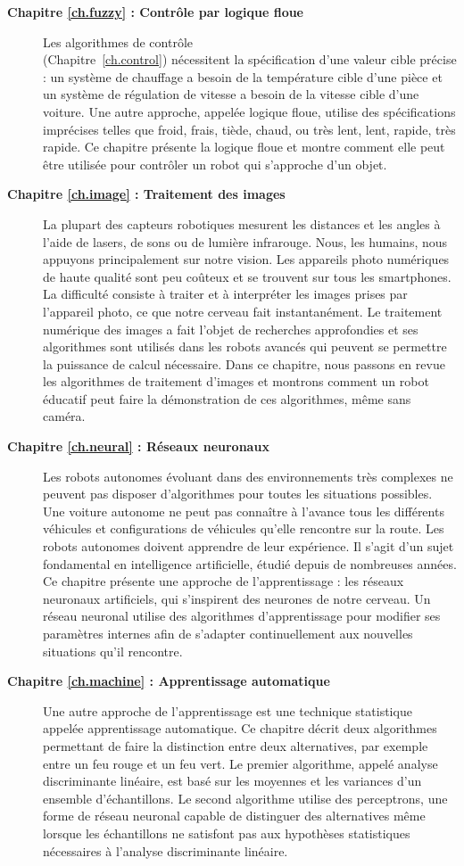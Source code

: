 \begin{description}
\item [\textbf{Chapitre \ref{ch.fuzzy} : Contrôle par logique floue}]
Les algorithmes de contrôle\\(Chapitre~\ref{ch.control}) nécessitent la spécification d'une valeur cible précise : un système de chauffage a besoin de la température cible d'une pièce et un système de régulation de vitesse a besoin de la vitesse cible d'une voiture. Une autre approche, appelée logique floue, utilise des spécifications imprécises telles que froid, frais, tiède, chaud, ou très lent, lent, rapide, très rapide. Ce chapitre présente la logique floue et montre comment elle peut être utilisée pour contrôler un robot qui s'approche d'un objet.
\smallskip
\item [\textbf{Chapitre \ref{ch.image} : Traitement des images}] La plupart des capteurs robotiques mesurent les distances et les angles à l'aide de lasers, de sons ou de lumière infrarouge. Nous, les humains, nous appuyons principalement sur notre vision. Les appareils photo numériques de haute qualité sont peu coûteux et se trouvent sur tous les smartphones. La difficulté consiste à traiter et à interpréter les images prises par l'appareil photo, ce que notre cerveau fait instantanément. Le traitement numérique des images a fait l'objet de recherches approfondies et ses algorithmes sont utilisés dans les robots avancés qui peuvent se permettre la puissance de calcul nécessaire. Dans ce chapitre, nous passons en revue les algorithmes de traitement d'images et montrons comment un robot éducatif peut faire la démonstration de ces algorithmes, même sans caméra.
\smallskip
\item [\textbf{Chapitre \ref{ch.neural} : Réseaux neuronaux}] Les robots autonomes évoluant dans des environnements très complexes ne peuvent pas disposer d'algorithmes pour toutes les situations possibles. Une voiture autonome ne peut pas connaître à l'avance tous les différents véhicules et configurations de véhicules qu'elle rencontre sur la route. Les robots autonomes doivent apprendre de leur expérience. Il s'agit d'un sujet fondamental en intelligence artificielle, étudié depuis de nombreuses années. Ce chapitre présente une approche de l'apprentissage : les réseaux neuronaux artificiels, qui s'inspirent des neurones de notre cerveau. Un réseau neuronal utilise des algorithmes d'apprentissage pour modifier ses paramètres internes afin de s'adapter continuellement aux nouvelles situations qu'il rencontre.
\smallskip
\item [\textbf{Chapitre \ref{ch.machine} : Apprentissage automatique}] Une autre approche de l'apprentissage est une technique statistique appelée apprentissage automatique. Ce chapitre décrit deux algorithmes permettant de faire la distinction entre deux alternatives, par exemple entre un feu rouge et un feu vert. Le premier algorithme, appelé analyse discriminante linéaire, est basé sur les moyennes et les variances d'un ensemble d'échantillons. Le second algorithme utilise des perceptrons, une forme de réseau neuronal capable de distinguer des alternatives même lorsque les échantillons ne satisfont pas aux hypothèses statistiques nécessaires à l'analyse discriminante linéaire.

\end{description}
